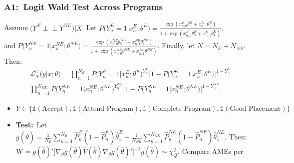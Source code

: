 \documentclass[12pt, aspectratio=169]{beamer}
\newcommand{\indep}{\perp \!\!\! \perp}
\begin{document}
\begin{frame}[label=lowt]
\frametitle{A1:\ Logit Wald Test Across Programs}
Assume $\big(Y^E\indep Y^{NE}\big)\big|X$. Let $P\big(Y_n^E=1\big|x_n^E;\theta^E\big) = \frac{\exp(x_{n,0}^E\theta_0^E+x_{n,1}^E\theta_1^E)}{1+\exp(x_{n,0}^E\theta_0^E+x_{n,1}^E\theta_1^E)}$, \\ and $P\big(Y_n^{NE}=1\big|x_n^{NE};\theta^{NE}\big) = \frac{\exp(x_{n,0}^{NE}\theta_0^{NE}+x_{n,1}^{NE}\theta_1^{NE})}{1+\exp(x_{n,0}^{NE}\theta_0^{NE}+x_{n,1}^{NE}\theta_1^{NE})}$. Finally, let $N=N_E+N_{NE}$. Then:
\begin{multline*}
\mathcal{L}_N^U\big(y\big|x;\theta\big) = \prod_{n=1}^{N_E}P\big(Y_n^E=1\big|x_n^E;\theta^E\big)^{Y_n^E}\big[1-P\big(Y_n^E=1\big|x_n^E;\theta^E\big)\big]^{1-Y_n^E}\\
\prod_{n=1}^{N_{NE}}P\big(Y_n^{NE}=1\big|x_n^{NE};\theta^{NE}\big)^{Y_n^{NE}}\big[1-P\big(Y_n^{NE}=1\big|x_n^{NE};\theta^{NE}\big)\big]^{1-Y_n^{NE}}.
\end{multline*}
\begin{itemize}
\item $Y \in \{\mathds{1}(\text{Accept}), \mathds{1}(\text{Attend Program}), \mathds{1}(\text{Complete Program}), \mathds{1}(\text{Good Placement})\}$
\vspace{2.5pt}
\item \textbf{Test:}\ Let $g(\hat\theta)\!=\!\frac{1}{N_E}\!\sum_{n=1}^{N_E}\!\hat P_n^E(1\!-\!\hat P_n^E)\hat\theta_1^E\!-\!\frac{1}{N_{NE}}\!\sum_{n=1}^{N_{NE}}\!\hat P_n^{NE}(1\!-\!\hat P_n^{NE})\hat\theta_1^{NE}$. Then: \\ $\text{W} = g(\hat\theta)'[\nabla_\theta g(\hat\theta)\hat V(\hat\theta)\nabla_\theta g(\hat\theta)'\big]^{-1}g(\hat\theta)\sim\chi_Q^2$. Compare AMEs per \citet{mood2010}
\end{itemize}
\hyperlink{avsa}{}
\end{frame}
\end{document}
